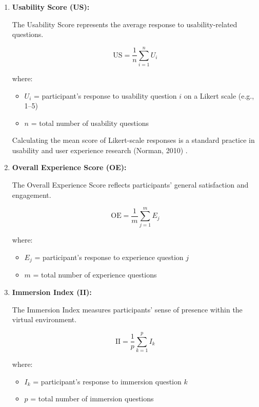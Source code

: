 \documentclass[12pt]{article}
\begin{document}
\begin{enumerate}
    \item \textbf{Usability Score (US):}

    The Usability Score represents the average response to usability-related questions.

    \[
    \text{US} = \frac{1}{n} \sum_{i=1}^{n} U_i
    \]

    where:

    \begin{itemize}
        \item \( U_i \) = participant's response to usability question \( i \) on a Likert scale (e.g., 1--5)
        \item \( n \) = total number of usability questions
    \end{itemize}

    Calculating the mean score of Likert-scale responses is a standard practice in usability and user experience research (Norman, 2010) \cite{Norman2010Likert}.

    \item \textbf{Overall Experience Score (OE):}

    The Overall Experience Score reflects participants' general satisfaction and engagement.

    \[
    \text{OE} = \frac{1}{m} \sum_{j=1}^{m} E_j
    \]

    where:

    \begin{itemize}
        \item \( E_j \) = participant's response to experience question \( j \)
        \item \( m \) = total number of experience questions
    \end{itemize}

    \item \textbf{Immersion Index (II):}

    The Immersion Index measures participants' sense of presence within the virtual environment.

    \[
    \text{II} = \frac{1}{p} \sum_{k=1}^{p} I_k
    \]

    where:

    \begin{itemize}
        \item \( I_k \) = participant's response to immersion question \( k \)
        \item \( p \) = total number of immersion questions
    \end{itemize}

\end{enumerate}
\end{document}
